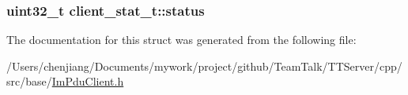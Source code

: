 \subsubsection[{status}]{\setlength{\rightskip}{0pt plus 5cm}uint32\+\_\+t client\+\_\+stat\+\_\+t\+::status}\label{structclient__stat__t_a5bec1e511cae234576ca323a25d5e4c4}


The documentation for this struct was generated from the following file\+:\begin{DoxyCompactItemize}
\item 
/\+Users/chenjiang/\+Documents/mywork/project/github/\+Team\+Talk/\+T\+T\+Server/cpp/src/base/\hyperlink{_im_pdu_client_8h}{Im\+Pdu\+Client.\+h}\end{DoxyCompactItemize}
